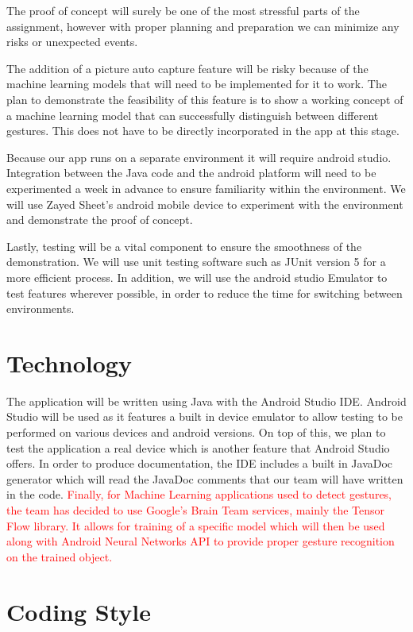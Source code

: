 \documentclass{article}
\begin{document}
The proof of concept will surely be one of the most stressful parts of the assignment, however with proper planning and preparation we can minimize any risks or unexpected events. 

The addition of a picture auto capture feature will be risky because of the machine learning models that will need to be implemented for it to work. The plan to demonstrate the feasibility of this feature is to show a working concept of a machine learning model that can successfully distinguish between different gestures. This does not have to be directly incorporated in the app at this stage.

Because our app runs on a separate environment it will require android studio. Integration between the Java code and the android platform will need to be experimented a week in advance to ensure familiarity within the environment. We will use Zayed Sheet’s android mobile device to experiment with the environment and demonstrate the proof of concept. 

Lastly, testing will be a vital component to ensure the smoothness of the demonstration. We will use unit testing software such as JUnit version 5 for a more efficient process. In addition, we will use the android studio Emulator to test features wherever possible, in order to reduce the time for switching between environments. 


\section{Technology}

The application will be written using Java with the Android Studio IDE. Android Studio will be used as it features a built in device emulator to allow testing to be performed on various devices and android versions. On top of this, we plan to test the application a real device which is another feature that Android Studio offers. In order to produce documentation, the IDE includes a built in JavaDoc generator which will read the JavaDoc comments that our team will have written in the code. \textcolor{red}{Finally, for Machine Learning applications used to detect gestures, the team has decided to use Google's Brain Team services, mainly the Tensor Flow library. It allows for training of a specific model which will then be used along with Android Neural Networks API to provide proper gesture recognition on the trained object.}

\section{Coding Style}
\end{document}
